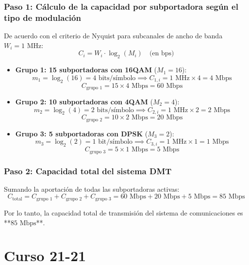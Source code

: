 \begin{resolucion}
\subsubsection*{Paso 1: Cálculo de la capacidad por subportadora según el tipo de modulación}

De acuerdo con el criterio de Nyquist para subcanales de ancho de banda $W_i = 1\text{ MHz}$:
\[
C_i = W_i \cdot \log_2(M_i) \quad \text{(en bps)}
\]

\begin{itemize}
    \item \textbf{Grupo 1: 15 subportadoras con 16QAM} ($M_1 = 16$):
      \[
      m_1 = \log_2(16) = 4\text{ bits/símbolo} \implies C_{1,i} = 1\text{ MHz} \times 4 = 4\text{ Mbps}
      \]
      \[
      C_{\text{grupo 1}} = 15 \times 4\text{ Mbps} = 60\text{ Mbps}
      \]

    \item \textbf{Grupo 2: 10 subportadoras con 4QAM} ($M_2 = 4$):
      \[
      m_2 = \log_2(4) = 2\text{ bits/símbolo} \implies C_{2,i} = 1\text{ MHz} \times 2 = 2\text{ Mbps}
      \]
      \[
      C_{\text{grupo 2}} = 10 \times 2\text{ Mbps} = 20\text{ Mbps}
      \]

    \item \textbf{Grupo 3: 5 subportadoras con DPSK} ($M_3 = 2$):
      \[
      m_3 = \log_2(2) = 1\text{ bit/símbolo} \implies C_{3,i} = 1\text{ MHz} \times 1 = 1\text{ Mbps}
      \]
      \[
      C_{\text{grupo 3}} = 5 \times 1\text{ Mbps} = 5\text{ Mbps}
      \]
\end{itemize}

\subsubsection*{Paso 2: Capacidad total del sistema DMT}

Sumando la aportación de todas las subportadoras activas:
\[
C_{\text{total}} = C_{\text{grupo 1}} + C_{\text{grupo 2}} + C_{\text{grupo 3}} = 60\text{ Mbps} + 20\text{ Mbps} + 5\text{ Mbps} = 85\text{ Mbps}
\]

Por lo tanto, la capacidad total de transmisión del sistema de comunicaciones es **$85\text{ Mbps}$**.
\end{resolucion}


\newpage
\section{Curso 21-21}
\setcounter{problemacontador}{0}
